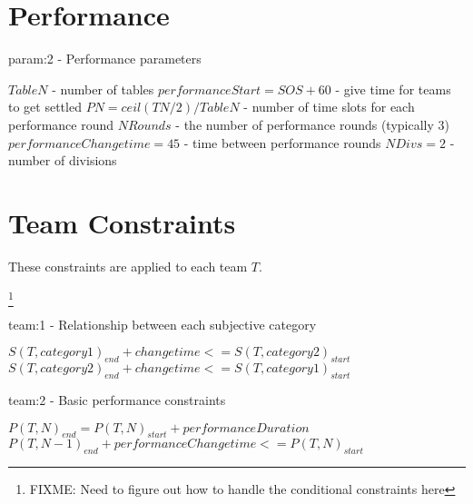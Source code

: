 \documentclass[letterpaper,11pt]{report}
\newcommand{\doccomment}[3]%
{\marginpar{\textcolor{#2}{\bf #1}}%
\footnote{{\color{#2}#3}}%
}
\newcommand{\doccomment}[3]{}
\newcommand{\jpscomment}[1]%
{\doccomment{SCHEWE}{Bittersweet}{#1}}
\begin{document}
\FloatBarrier
\section{Performance}
\begin{algorithm}
\caption{param:2 - Performance parameters}
\begin{algorithmic}
\STATE $TableN$ - number of tables
\STATE $performanceStart = SOS + 60$ - give time for teams to get settled
\STATE $PN = ceil(TN / 2) / TableN$ - number of time slots for each
performance round
\STATE $NRounds$ - the number of performance rounds (typically 3)
\STATE $performanceChangetime = 45$ - time between performance rounds
\STATE $NDivs = 2$ - number of divisions
\end{algorithmic}
\end{algorithm}

\FloatBarrier
\section{Team Constraints}
These constraints are applied to each team $T$.

\jpscomment{FIXME: Need to figure out how to handle the conditional constraints here}
\begin{algorithm}
\caption{team:1 - Relationship between each subjective category}
\begin{algorithmic}
        \STATE $S(T, category1)_{end} + changetime <= S(T, category2)_{start}$
      \ELSE
        \STATE $S(T, category2)_{end} + changetime <= S(T, category1)_{start}$
      \ENDIF
    \ENDIF
  \ENDFOR
\ENDFOR
\end{algorithmic}
\end{algorithm}

\begin{algorithm}
\caption{team:2 - Basic performance constraints}
\begin{algorithmic}
  \STATE $P(T, N)_{end} = P(T, N)_{start} + performanceDuration$
\ENDFOR
{}
  \STATE $P(T, N-1)_{end} + performanceChangetime <= P(T, N)_{start}$
\ENDFOR
\end{algorithmic}
\end{algorithm}
\end{document}
